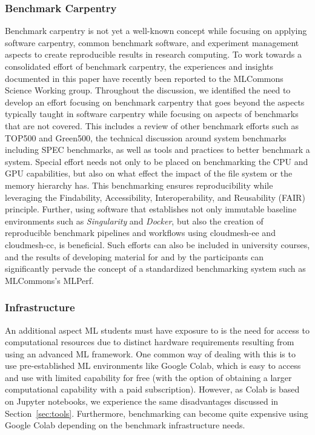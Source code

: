 \documentclass[utf8]{FrontiersinVancouver} %
\begin{document}
\subsubsection{Benchmark Carpentry}

Benchmark carpentry is not yet a well-known concept while focusing on applying software carpentry, common benchmark software, and experiment management aspects to create reproducible results in research computing.  To work towards a consolidated effort of benchmark carpentry,  the experiences and insights documented in this paper have recently been reported to the MLCommons Science Working group. Throughout the discussion, we identified the need to develop an effort focusing on benchmark carpentry that goes beyond the aspects typically taught in software carpentry while focusing on aspects of benchmarks that are not covered. This includes a review of other benchmark efforts such as TOP500 and Green500, the technical discussion around system benchmarks including SPEC benchmarks, as well as tools and practices to better benchmark a system. Special effort needs not only to be placed on benchmarking the CPU and GPU capabilities, but also on what effect the impact of the file system or the memory hierarchy has. This benchmarking ensures reproducibility while leveraging the Findability, Accessibility, Interoperability, and Reusability (FAIR) principle. Further, using software that establishes not only immutable baseline environments such as {\em Singularity} and {\em Docker}, but also the creation of reproducible benchmark pipelines and workflows using cloudmesh-ee and cloudmesh-cc, is beneficial. Such efforts can also be included in university courses, and the results of developing material for and by the participants can significantly pervade the concept of a standardized benchmarking system such as MLCommons's MLPerf.

\subsubsection{Infrastructure}

An additional aspect ML students must have exposure to is the need for access to computational resources due to distinct hardware requirements resulting from using an advanced ML framework. One common way of dealing with this is to use pre-established ML environments like Google Colab, which is easy to access and use with limited capability for free (with the option of obtaining a larger computational capability with a paid subscription).  However, as Colab is based on Jupyter notebooks, we experience the same disadvantages discussed in Section~\ref{sec:tools}. Furthermore, benchmarking can become quite expensive using Google Colab depending on the benchmark infrastructure needs.
\end{document}
